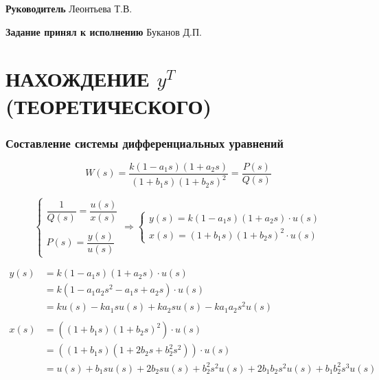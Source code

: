 \documentclass[a4paper, 12pt]{article}
\begin{document}
\vfill

\noindent \textbf{Руководитель} \hfill
\hfill \uline{\hspace{3cm}} \hspace{1.1cm} Леонтьева Т.В.

\vspace{1cm}

\noindent \textbf{Задание принял к исполнению} \hfill
\hfill \uline{\hspace{3cm}} \hspace{1.7cm} Буканов Д.П.


\newpage
\part{НАХОЖДЕНИЕ $y^T$ (ТЕОРЕТИЧЕСКОГО)}
\section{Составление системы дифференциальных уравнений}

$$
    W(s) = \frac{k(1-a_1s)(1+a_2s)}{(1+b_1s)(1+b_2s)^2} = \frac{P(s)}{Q(s)}
$$

\vspace{1cm}

$$
    \begin{cases}
        \dfrac{1}{Q(s)} = \dfrac{u(s)}{x(s)}
        \\\\ %
        P(s) = \dfrac{y(s)}{u(s)}
    \end{cases}
    \Rightarrow
    \begin{cases}
        y(s) = k(1-a_1s)(1+a_2s) \cdot u(s)
        \\
        x(s) = (1+b_1s)(1+b_2s)^2 \cdot u(s)
    \end{cases}
$$

\vspace{1cm}

$$
    \begin{aligned}
        y(s)
        &= k(1-a_1s)(1+a_2s) \cdot u(s) \\
        &= k(1 - a_1a_2s^2-a_1s + a_2s) \cdot u(s) \\
        &= ku(s) - ka_1su(s) + ka_2su(s) - ka_1a_2s^2u(s) 
        \\\\
        x(s)
        &= ((1+b_1s)(1+b_2s)^2) \cdot u(s) \\
        &= ((1+b_1s)(1+2b_2s + b_2^2s^2)) \cdot u(s) \\
        &= u(s) + b_1su(s) + 2b_2su(s) + b_2^2s^2u(s) + 2b_1b_2s^2u(s) + b_1b_2^2s^3u(s)
    \end{aligned}
$$
\end{document}
